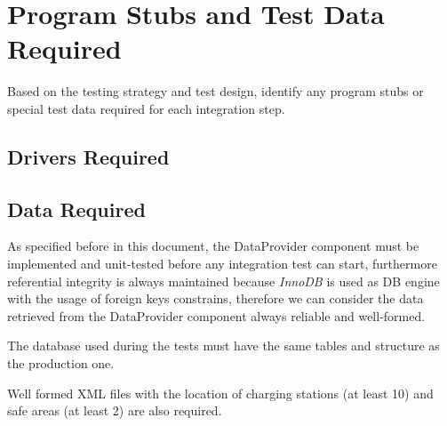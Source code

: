 \section{Program Stubs and Test Data Required}

Based on the testing strategy and test design, identify any program stubs or special test data required for each integration step.

\subsection{Drivers Required}

\subsection{Data Required}
As specified before in this document, the DataProvider component must be implemented and unit-tested before  any integration test can start, furthermore referential integrity is always maintained because \emph{InnoDB} is used as DB engine with the usage of foreign keys constrains, therefore we can consider the data retrieved from the DataProvider component always reliable and well-formed.

The database used during the tests must have the same tables and structure as the production one.

Well formed XML files with the location of charging stations (at least 10) and safe areas (at least 2) are also required.

